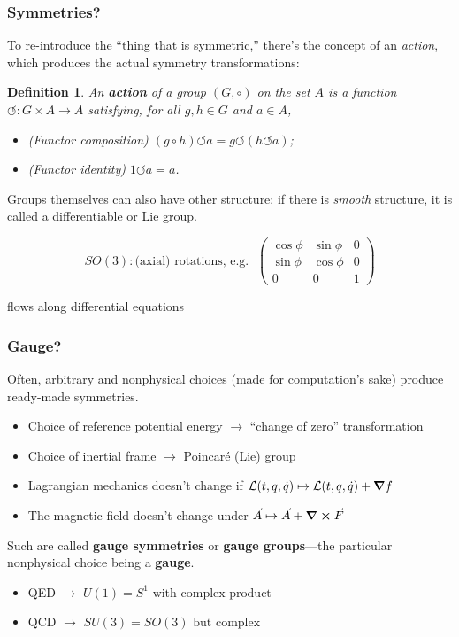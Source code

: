 \documentclass[10pt]{beamer}
\newtheorem{mydef}{Definition}
\begin{document}
\begin{frame}
  \frametitle{Symmetries?}
  To re-introduce the ``thing that is symmetric,'' there's the concept of an \textit{action},
  which produces the actual symmetry transformations:
  \begin{mydef}
    An \textbf{action} of a group $(G, \circ)$ on the set $A$ is a function $\circlearrowleft: G \times A \to A$ satisfying,
    for all $g, h \in G$ and $a \in A$,
    \begin{itemize}
    \item (Functor composition) $(g \circ h) \circlearrowleft a = g \circlearrowleft (h \circlearrowleft a)$;
    \item (Functor identity) $1 \circlearrowleft a = a$.
    \end{itemize}
  \end{mydef}

  Groups themselves can also have other structure; if there is \textit{smooth} structure,
  it is called a differentiable or Lie group.

  \[
    SO(3): \text{(axial) rotations, e.g. } \;
    \begin{pmatrix}
      \cos\phi & \sin\phi & 0 \\
      \sin\phi & \cos\phi & 0 \\
      0 & 0 & 1
    \end{pmatrix}
  \]
  \begin{center}
    flows along differential equations
  \end{center}
\end{frame}

\begin{frame}
  \frametitle{Gauge?}
  Often, arbitrary and nonphysical choices (made for computation's sake) produce ready-made symmetries.
  \begin{itemize}
  \item Choice of reference potential energy $\to$ ``change of zero'' transformation
  \item Choice of inertial frame $\to$ Poincar\'e (Lie) group
  \item Lagrangian mechanics doesn't change if $\mathcal{L}(t, q, \dot{q}) \mapsto \mathcal{L}(t, q, \dot{q}) + \grad{f}$
  \item The magnetic field doesn't change under $\vec{A} \mapsto \vec{A} + \curl{\vec{F}}$
  \end{itemize}

  Such are called \textbf{gauge symmetries} or \textbf{gauge groups}---the particular nonphysical choice being a \textbf{gauge}.

  \begin{itemize}
  \item QED $\to$ $U(1) = S^{1} \text{ with complex product}$
  \item QCD $\to$ $SU(3) = SO(3) \text{ but complex}$
  \end{itemize}
\end{frame}
\end{document}
